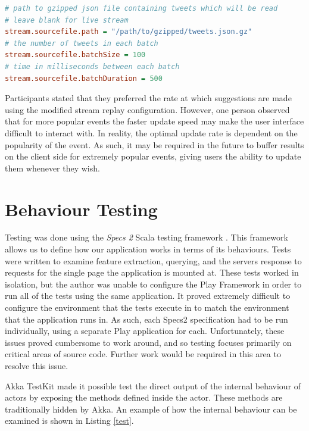 \documentclass{l4proj}
\begin{document}
\begin{lstlisting}[caption=Configuration of the stream replay rate in application.conf,language=Ini]
# path to gzipped json file containing tweets which will be read
# leave blank for live stream
stream.sourcefile.path = "/path/to/gzipped/tweets.json.gz"
# the number of tweets in each batch
stream.sourcefile.batchSize = 100
# time in milliseconds between each batch
stream.sourcefile.batchDuration = 500
\end{lstlisting}

Participants stated that they preferred the rate at which suggestions are made using the modified stream replay configuration. However, one person observed that for more popular events the faster update speed may make the user interface difficult to interact with. In reality, the optimal update rate is dependent on the popularity of the event. As such, it may be required in the future to buffer results on the client side for extremely popular events, giving users the ability to update them whenever they wish.

\section{Behaviour Testing}

    Testing was done using the \textit{Specs 2} Scala testing framework \cite{specs2}. This framework allows us to define how our application works in terms of its behaviours. Tests were written to examine feature extraction, querying, and the servers response to requests for the single page the application is mounted at. These tests worked in isolation, but the author was unable to configure the Play Framework in order to run all of the tests using the same application. It proved extremely difficult to configure the environment that the tests execute in to match the environment that the application runs in. As such, each Specs2 specification had to be run individually, using a separate Play application for each. Unfortunately, these issues proved cumbersome to work around, and so testing focuses primarily on critical areas of source code. Further work would be required in this area to resolve this issue. 
     
    Akka TestKit \cite{akka} made it possible test the direct output of the internal behaviour of actors by exposing the methods defined inside the actor. These methods are traditionally hidden by Akka. An example of how the internal behaviour can be examined is shown in Listing \ref{test}.
    
\end{document}
